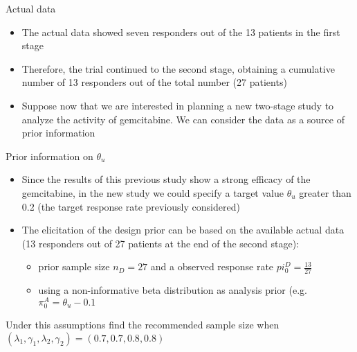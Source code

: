 \documentclass{beamer}
\begin{document}
\begin{frame}{Actual data}

\begin{itemize}
\item
  The actual data showed seven responders out of the 13 patients in the
  first stage
\item
  Therefore, the trial continued to the second stage, obtaining a
  cumulative number of 13 responders out of the total number (27
  patients)
\item
  Suppose now that we are interested in planning a new two-stage study
  to analyze the activity of gemcitabine. We can consider the data as a
  source of prior information
\end{itemize}

\end{frame}


\begin{frame}{Prior information on \(\theta_u\)}

\begin{itemize}
\item
  Since the results of this previous study show a strong efficacy of the
  gemcitabine, in the new study we could specify a target value
  \(\theta_u\) greater than 0.2 (the target response rate previously
  considered)
\item
  The elicitation of the design prior can be based on the available
  actual data (13 responders out of 27 patients at the end of the second
  stage):

  \begin{itemize}
  \itemsep1pt\parskip0pt
  \item
    prior sample size \(n_D=27\) and a observed response rate
    \(pi_0^D=\frac{13}{27}\)
  \item
    using a non-informative beta distribution as analysis prior (e.g.
    \(\pi_0^{A}=\theta_u-0.1\)
  \end{itemize}
\end{itemize}

Under this assumptions find the recommended sample size when
\((\lambda_1,\gamma_1, \lambda_2,\gamma_2)=(0.7,0.7,0.8,0.8)\)

\end{frame}
\end{document}
